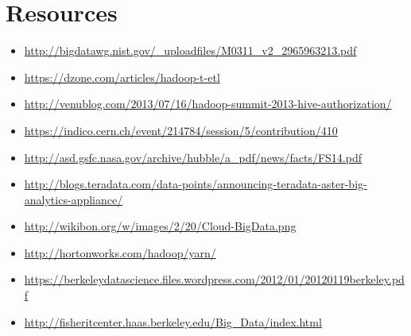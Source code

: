 \section{Resources}

\begin{itemize}
\item
  \url{http://bigdatawg.nist.gov/_uploadfiles/M0311_v2_2965963213.pdf}
\item
  \url{https://dzone.com/articles/hadoop-t-etl}
\item
  \url{http://venublog.com/2013/07/16/hadoop-summit-2013-hive-authorization/}
\item
  \url{https://indico.cern.ch/event/214784/session/5/contribution/410}
\item
  \url{http://asd.gsfc.nasa.gov/archive/hubble/a_pdf/news/facts/FS14.pdf}
\item
  \url{http://blogs.teradata.com/data-points/announcing-teradata-aster-big-analytics-appliance/}
\item
  \url{http://wikibon.org/w/images/2/20/Cloud-BigData.png}
\item
  \url{http://hortonworks.com/hadoop/yarn/}
\item
  \url{https://berkeleydatascience.files.wordpress.com/2012/01/20120119berkeley.pdf}
\item
  \url{http://fisheritcenter.haas.berkeley.edu/Big_Data/index.html}
\end{itemize}
